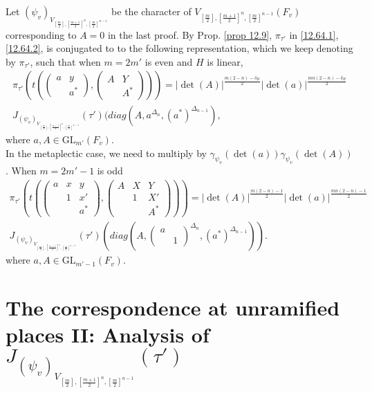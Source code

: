 \documentclass[12pts]{amsart}
\newcommand{\GL}{{\mathrm{GL}}}
\begin{document}
Let $(\psi_v)_{V_{[\frac{m}{2}],[\frac{m+1}{2}]^n,[\frac{m}{2}]^{n-1}}}$ be the character of $V_{[\frac{m}{2}],[\frac{m+1}{2}]^n,[\frac{m}{2}]^{n-1}}(F_v)$ corresponding to $A=0$ in the last proof. 
By Prop. \ref{prop 12.9}, $\pi_{\tau'}$ in \eqref{12.64.1}, \eqref{12.64.2}, is conjugated to to the following representation, which we keep denoting by $\pi_{\tau'}$, such that  when $m=2m'$ is even and $H$ is linear,
\begin{multline}\label{12.73}
\pi_{\tau'}(t(\begin{pmatrix}a&y\\&a^*\end{pmatrix}, \begin{pmatrix}A&Y\\&A^*\end{pmatrix}))=|\det(A)|^{\frac{m(2-n)-\delta_H}{2}}|\det(a)|^{\frac{mn(2-n)-\delta_H}{2}}\\
J_{(\psi_v)_{V_{[\frac{m}{2}],[\frac{m+1}{2}]^n,[\frac{m}{2}]^{n-1}}}}(\tau')(diag( A,a^{\Delta_n},(a^*)^{\Delta_{n-1}}),
\end{multline}
where $a, A\in \GL_{m'}(F_v)$.\\
In the metaplectic case, we need to multiply by $\gamma_{\psi_v}(\det(a))\gamma_{\psi_v}(\det(A))$.
When $m=2m'-1$ is odd
\begin{multline}\label{12.74}
\pi_{\tau'}(t(\begin{pmatrix}a&x&y\\&1&x'\\&&a^*\end{pmatrix}, \begin{pmatrix}A&X&Y\\&1&X'\\&&A^*\end{pmatrix}))=|\det(A)|^{\frac{m(2-n)-1}{2}}|\det(a)|^{\frac{mn(2-n)-1}{2}}\\
J_{(\psi_v)_{V_{[\frac{m}{2}],[\frac{m+1}{2}]^n,[\frac{m}{2}]^{n-1}}}}(\tau')(diag(A, \begin{pmatrix}a\\&1\end{pmatrix}^{\Delta_n},(a^*)^{\Delta_{n-1}})).
\end{multline}
where $a, A\in \GL_{m'-1}(F_v)$.



\section{The correspondence at unramified places II: Analysis of $J_{(\psi_v)_{V_{[\frac{m}{2}],[\frac{m+1}{2}]^n,[\frac{m}{2}]^{n-1}}}}(\tau')$}
\end{document}
